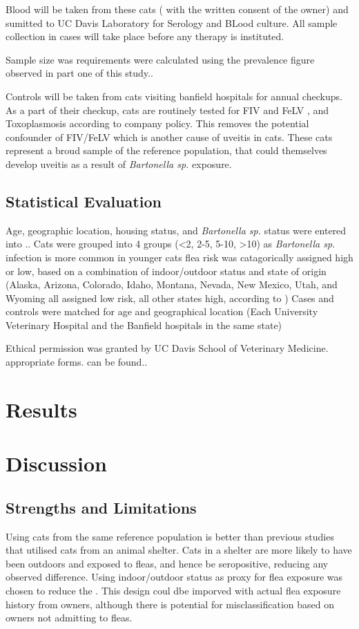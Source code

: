 \documentclass[12pt]{article}
\begin{document}
	Blood will be taken from these cats ( with the written consent of the owner) and sumitted to UC Davis Laboratory for Serology and BLood culture.
	All sample collection in cases will take place before any therapy is instituted.

	Sample size was requirements were calculated using the prevalence figure observed in part one of this study..

	Controls will be taken from cats visiting banfield hospitals for annual checkups. As a part of their checkup, cats are routinely tested for FIV and FeLV , and Toxoplasmosis according to company policy. This removes the potential confounder of FIV/FeLV which is another cause of uveitis in cats. These cats represent a broud sample of the reference population, that could themselves develop uveitis as a result of \emph{Bartonella sp.} exposure.
	

	\subsection{Statistical Evaluation}
		Age, geographic location, housing status, and \emph{Bartonella sp.} status were entered into ..
		Cats were grouped into 4 groups (<2, 2-5, 5-10, >10) as \emph{Bartonella sp.} infection is more common in younger cats
		flea risk was catagorically assigned high or low, based on a combination of indoor/outdoor status and state of origin (Alaska, Arizona, Colorado, Idaho, Montana, Nevada, New Mexico, Utah, and Wyoming all assigned low risk, all other states high, according to \cite{Jameson1995a})
		Cases and controls were matched for age and geographical location (Each University Veterinary Hospital and the Banfield hospitals in the same state)



	Ethical permission was granted by UC Davis School of Veterinary Medicine. appropriate forms. can be found..

\section{Results}
\section{Discussion}
	\subsection{Strengths and Limitations}
		Using cats from the same reference population is better than previous studies that utilised cats from an animal shelter. Cats in a shelter are more likely to have been outdoors and exposed to fleas, and hence be seropositive, reducing any observed difference.
		Using indoor/outdoor status as proxy for flea exposure was chosen to reduce the . 
		This design coul dbe imporved with actual flea exposure history from owners, although there is potential for misclassification based on owners not admitting to fleas.

\newpage


\end{document}
